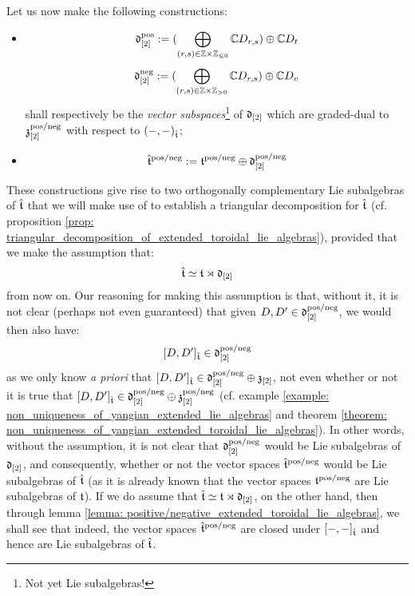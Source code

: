         Let us now make the following constructions:
        \begin{itemize}
            \item
                $$\d_{[2]}^{\positive} := ( \bigoplus_{(r, s) \in \Z \x \Z_{\leq 0} } \bbC D_{r, s} ) \oplus \bbC D_t$$
                $$\d_{[2]}^{\negative} := ( \bigoplus_{(r, s) \in \Z \x \Z_{> 0} } \bbC D_{r, s} ) \oplus \bbC D_v$$
            shall respectively be the \textit{vector subspaces}\footnote{Not yet Lie subalgebras!} of $\mathfrak{d}_{[2]}$ which are graded-dual to $\mathfrak{z}_{[2]}^{\mathrm{pos}/\mathrm{neg}}$ with respect to $(-, -)_{\hat{\mathfrak{t}}}$;
            \item
                $$\hat{\mathfrak{t}}^{\mathrm{pos}/\mathrm{neg}} := \mathfrak{t}^{\mathrm{pos}/\mathrm{neg}} \oplus \mathfrak{d}_{[2]}^{\mathrm{pos}/\mathrm{neg}}$$
        \end{itemize}
        \begin{remark}
            These constructions give rise to two orthogonally complementary Lie subalgebras of $\hat{\mathfrak{t}}$ that we will make use of to establish a triangular decomposition for $\hat{\mathfrak{t}}$ (cf. proposition \ref{prop: triangular_decomposition_of_extended_toroidal_lie_algebras}), provided that we make the assumption that:
                $$\hat{\mathfrak{t}} \simeq \mathfrak{t} \rtimes \mathfrak{d}_{[2]}$$
            from now on. Our reasoning for making this assumption is that, without it, it is not clear (perhaps not even guaranteed) that given $D, D' \in \mathfrak{d}_{[2]}^{\mathrm{pos}/\mathrm{neg}}$, we would then also have:
                $$[D, D']_{\hat{\mathfrak{t}}} \in \mathfrak{d}_{[2]}^{\mathrm{pos}/\mathrm{neg}}$$
            as we only know \textit{a priori} that $[D, D']_{\hat{\mathfrak{t}}} \in \mathfrak{d}_{[2]}^{\mathrm{pos}/\mathrm{neg}} \oplus \mathfrak{z}_{[2]}$, not even whether or not it is true that $[D, D']_{\hat{\mathfrak{t}}} \in \mathfrak{d}_{[2]}^{\mathrm{pos}/\mathrm{neg}} \oplus \mathfrak{z}_{[2]}^{\mathrm{pos}/\mathrm{neg}}$ (cf. example \ref{example: non_uniqueness_of_yangian_extended_lie_algebras} and theorem \ref{theorem: non_uniqueness_of_yangian_extended_toroidal_lie_algebras}). In other words, without the assumption, it is not clear that $\mathfrak{d}_{[2]}^{\mathrm{pos}/\mathrm{neg}}$ would be Lie subalgebras of $\mathfrak{d}_{[2]}$, and consequently, whether or not the vector spaces $\hat{\mathfrak{t}}^{\mathrm{pos}/\mathrm{neg}}$ would be Lie subalgebras of $\hat{\mathfrak{t}}$ (as it is already known that the vector spaces $\mathfrak{t}^{\mathrm{pos}/\mathrm{neg}}$ are Lie subalgebras of $\mathfrak{t}$). If we do assume that $\hat{\mathfrak{t}} \simeq \mathfrak{t} \rtimes \mathfrak{d}_{[2]}$, on the other hand, then through lemma \ref{lemma: positive/negative_extended_toroidal_lie_algebras}, we shall see that indeed, the vector spaces $\hat{\mathfrak{t}}^{\mathrm{pos}/\mathrm{neg}}$ are closed under $[-, -]_{\hat{\mathfrak{t}}}$ and hence are Lie subalgebras of $\hat{\mathfrak{t}}$.
        \end{remark}
        
